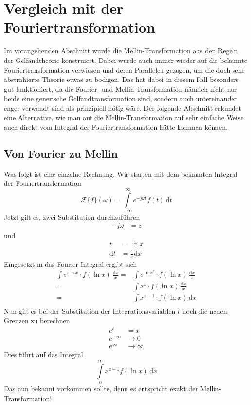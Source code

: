 %
%
%
%
\section{Vergleich mit der Fouriertransformation
\label{mellin:section:teil3}}
Im vorangehenden Abschnitt wurde die Mellin-Transformation aus den 
Regeln der Gelfandtheorie konstruiert. 
Dabei wurde auch immer wieder auf die bekannte Fouriertransformation 
verwiesen und deren Parallelen gezogen, um die doch sehr abstrahierte 
Theorie etwas zu bodigen.
Das hat dabei in diesem Fall besonders gut funktioniert, da die Fourier- 
und Mellin-Transformation nämlich nicht nur beide eine generische 
Gelfandtransformation sind, sondern auch untereinander enger verwandt 
sind als prinzipiell nötig wäre.
Der folgende Abschnitt erkundet eine Alternative, wie man auf die 
Mellin-Transformation auf sehr einfache Weise auch direkt vom Integral 
der Fouriertransformation hätte kommen können.

\subsection{Von Fourier zu Mellin
\label{mellin:subsection:foumel}}
Was folgt ist eine einzelne Rechnung.
Wir starten mit dem bekannten Integral der Fouriertransformation
\begin{equation}
    \mathcal{F}\{f \}(\omega) = 
    \int\limits_{-\infty}^{\infty} e^{-j\omega{}t} f(t) \,\mathrm{d}t
    \label{mellin:fourier}
\end{equation}
Jetzt gilt es, zwei Substitution durchzuführen
\begin{align*}
    -j\omega &= z
\end{align*}
und
\begin{align*}
    t &= \ln x \\
    \mathrm{d}t &= \frac{1}{x} \mathrm{d}x
\end{align*}
Eingesetzt in das Fourier-Integral ergibt sich
\begin{align*}
    \int e^{z \ln x} \cdot f(\ln x) \,\frac{\mathrm{d}x}{x}
    = &\int e^{\ln x^z} \cdot f(\ln x) \,\frac{\mathrm{d}x}{x} \\
    = &\int x^{z} \cdot f(\ln x) \,\frac{\mathrm{d}x}{x} \\
    = &\int x^{z-1} \cdot f(\ln x) \,\mathrm{d}x \\
\end{align*}
Nun gilt es bei der Substitution der Integrationsvariablen $t$ noch die 
neuen Grenzen zu berechnen
\begin{align*}
    e^{t} &= x \\
    e^{-\infty} &\rightarrow 0 \\
    e^{\infty} &\rightarrow \infty 
\end{align*}
Dies führt auf das Integral
\[
    \int\limits_{0}^{\infty} x^{z-1} f(\ln x) \,\mathrm{d}x
\]
Das nun bekannt vorkommen sollte, denn es entspricht exakt der 
Mellin-Transformation!
\medskip

